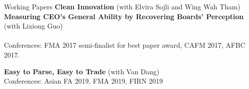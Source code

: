 \documentclass{resume} %
\begin{document}
\begin{rSection}{Working Papers}
	{\bf Clean Innovation} (with Elvira Sojli and Wing Wah Tham)\\

	{\bf Measuring CEO's General Ability by Recovering Boards' Perception} (with Lixiong Guo) \\
	\\ Conferences: FMA 2017 semi-finalist for best paper award, CAFM 2017, AFBC 2017.

		{\bf Easy to Parse, Easy to Trade} (with Van Dang)\\
	Conferences: Asian FA 2019, FMA 2019, FIRN 2019



\end{rSection}
\end{document}

